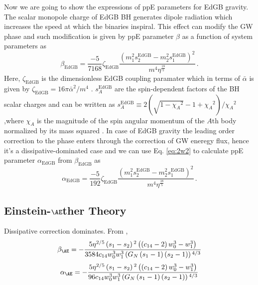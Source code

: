 \documentclass[prd,twocolumn,nofootinbib]{revtex4-1}
\begin{document}
Now we are going to show the expressions of ppE parameters for EdGB gravity. The scalar monopole charge of EdGB BH generates dipole radiation which increases the speed at which the binaries inspiral. This effect can modify the GW phase and such modification is given by ppE parameter $\beta$ as a function of system parameters as \cite{Yunes:2016jcc,Yagi:2011xp}
\begin{equation}
 \beta_{\text{EdGB}}=\frac{-5}{7168}\zeta_{\text{EdGB}}\frac{(m_1^2s_2^{\text{EdGB}}-m_2^2s_1^{\text{EdGB}})^2}{m^4\eta^{\frac{18}{5}}}\,.
 \end{equation}
 Here, $\zeta_{\text{EdGB}}$ is the dimensionless EdGB coupling paramater which in terms of $\bar{\alpha}$ is given by $\zeta_{\text{EdGB}}=16 \pi \bar{\alpha}^2/m^4$ \cite{Yunes:2016jcc}. $s_{A}^{\text{EdGB}}$ are the spin-dependent factors of the BH scalar charges and can be written as $s_{A}^{\text{EdGB}}\equiv 2(\sqrt{1-{\chi_A}^2}-1+{\chi_A}^2)/{\chi_A}^2~$,where $\chi_A$ is the magnitude of the spin angular momentum of the $\mathit{A}\text{th}$ body normalized by its mass squared \cite{Berti:2018cxi,Prabhu:2018aun}. In case of EdGB gravity the leading order correction to the phase enters through the correction of GW eneregy flux, hence it's a dissipative-dominated case and we can use Eq. \eqref{eq:2w2} to calculate ppE parameter $\alpha_{\text{EdGB}}$ from $\beta_{\text{EdGB}}$ as  
 \begin{equation}
 \alpha_{\text{EdGB}}=\frac{-5}{192}\zeta_{\text{EdGB}}\frac{(m_1^2s_2^{\text{EdGB}}-m_2^2s_1^{\text{EdGB}})^2}{m^4\eta^{\frac{18}{5}}}\,.
 \end{equation}
 
 
 
 \subsection{Einstein-$\AE$ther Theory}
 Dissipative correction dominates. From \cite{Hansen:2014ewa},
 \begin{equation}
 \beta_{\AE}=-\frac{5 \eta ^{2/5} \left(s_1-s_2\right){}^2 \left(\left(c_{14}-2\right) w_0^3-w_1^3\right)}{3584 c_{14} w_0^3 w_1^3 \left(\text{$G_N$} \left(s_1-1\right) \left(s_2-1\right)\right){}^{4/3}}
 \end{equation}
 \begin{equation}
 \alpha_{\AE}=-\frac{5 \eta ^{2/5} \left(s_1-s_2\right){}^2 \left(\left(c_{14}-2\right) w_0^3-w_1^3\right)}{96 c_{14} w_0^3 w_1^3 \left(\text{$G_N$} \left(s_1-1\right) \left(s_2-1\right)\right){}^{4/3}}
 \end{equation}
 
\end{document}
